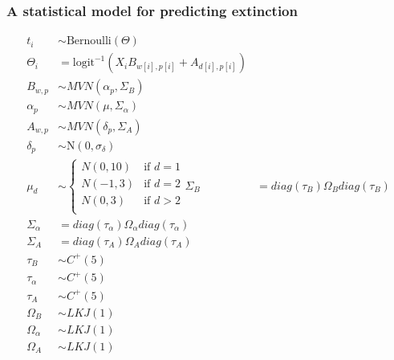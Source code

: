 \documentclass{beamer}
\begin{document}
\begin{frame}
  \frametitle{A statistical model for predicting extinction}

  \begin{equation}
  \begin{aligned}
    t_{i} &\sim \text{Bernoulli}(\Theta) \\
    \Theta_{i} &= \text{logit}^{-1} (X_{i} B_{w[i], p[i]} + A_{d[i], p[i]}) \\
    B_{w, p} &\sim MVN(\alpha_{p}, \Sigma_{B}) \\
    \alpha_{p} &\sim MVN(\mu, \Sigma_{\alpha}) \\
    A_{w, p} &\sim MVN(\delta_{p}, \Sigma_{A}) \\
    \delta_{p} &\sim \mathrm{N}(0, \sigma_{\delta}) \\
    \mu_{d} &\sim 
      \begin{cases}
        N(0, 10) & \text{if } d = 1 \\
        N(-1, 3) & \text{if } d = 2 \\
        N(0, 3) & \text{if } d > 2 \\
      \end{cases}
    \Sigma_{B} &= diag(\tau_{B}) \Omega_{B} diag(\tau_{B}) \\
    \Sigma_{\alpha} &= diag(\tau_{\alpha}) \Omega_{\alpha} diag(\tau_{\alpha}) \\
    \Sigma_{A} &= diag(\tau_{A}) \Omega_{A} diag(\tau_{A}) \\
    \tau_{B} &\sim C^{+}(5) \\
    \tau_{\alpha} &\sim C^{+}(5) \\
    \tau_{A} &\sim C^{+}(5) \\
    \Omega_{B} &\sim LKJ(1) \\
    \Omega_{\alpha} &\sim LKJ(1) \\
    \Omega_{A} &\sim LKJ(1) \\
  \end{aligned}
\end{equation}

\end{frame}
\end{document}

